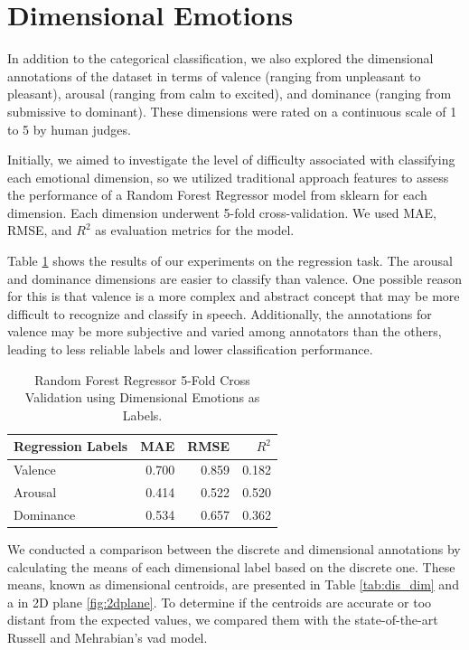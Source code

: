 \section{Dimensional Emotions}

In addition to the categorical classification, we also explored the dimensional annotations of the dataset in terms of valence (ranging from unpleasant to pleasant), arousal (ranging from calm to excited), and dominance (ranging from submissive to dominant). These dimensions were rated on a continuous scale of 1 to 5 by human judges.

Initially, we aimed to investigate the level of difficulty associated with classifying each emotional dimension, so we utilized traditional approach features to assess the performance of a Random Forest Regressor model from sklearn for each dimension. Each dimension underwent 5-fold cross-validation. We used MAE, RMSE, and $R^2$ as evaluation metrics for the model.

Table \ref{tab:dim_reg} shows the results of our experiments on the regression task. The arousal and dominance dimensions are easier to classify than valence. One possible reason for this is that valence is a more complex and abstract concept that may be more difficult to recognize and classify in speech. Additionally, the annotations for valence may be more subjective and varied among annotators than the others, leading to less reliable labels and lower classification performance.


\begin{table}[H]
	\centering
	\caption{Random Forest Regressor 5-Fold Cross Validation using Dimensional Emotions as Labels.}
	\label{tab:dim_reg}
	\begin{tabular}{lrrr}
		\toprule
		Regression Labels   &   MAE &  RMSE & $R^2$ \\
		\midrule
		Valence             & 0.700 & 0.859 & 0.182 \\
		Arousal             & 0.414 & 0.522 & 0.520 \\
		Dominance           & 0.534 & 0.657 & 0.362 \\
		\bottomrule
	\end{tabular}
\end{table}

We conducted a comparison between the discrete and dimensional annotations by calculating the means of each dimensional label based on the discrete one. These means, known as dimensional centroids, are presented in Table \ref{tab:dis_dim} and a in 2D plane \ref{fig:2dplane}. To determine if the centroids are accurate or too distant from the expected values, we compared them with the state-of-the-art Russell and Mehrabian's \ac{vad} model.

